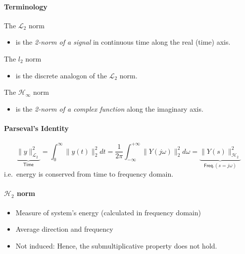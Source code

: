 \paragraph{Terminology}
The $\mathcal{L}_2$ norm
\begin{itemize}
    \item is the \textit{2-norm of a signal} in continuous time along the real (time) axis.
\end{itemize}
The $l_2$ norm
\begin{itemize}
    \item is the discrete analogon of the $\mathcal{L}_2$ norm.
\end{itemize}
The $\mathcal{H}_\infty$ norm
\begin{itemize}
    \item is the \textit{2-norm of a complex function} along the imaginary axis.
\end{itemize}

\paragraph{Parseval's Identity}
\noindent\begin{equation*}
    \underbrace{\|y\|_{\mathcal{L}_2}^2}_{\textsf{Time}}=\int_0^\infty\|y(t)\|_2^2 dt=\frac1{2\pi}\int_{-\infty}^{+\infty}\|Y(j\omega)\|_2^2 d\omega=\underbrace{\|Y(s)\|_{\mathcal{H}_2}^2}_{\textsf{Freq.} (s=j\omega)}
\end{equation*}
i.e.\ energy is conserved from time to frequency domain.

\paragraph[H2-induced Norm]{$\mathcal{H}_2$ norm}
\begin{itemize}
    \item Measure of system's energy (calculated in frequency domain)
    \item Average direction and frequency
    \item Not induced: Hence, the submultiplicative property does not hold.
\end{itemize}


